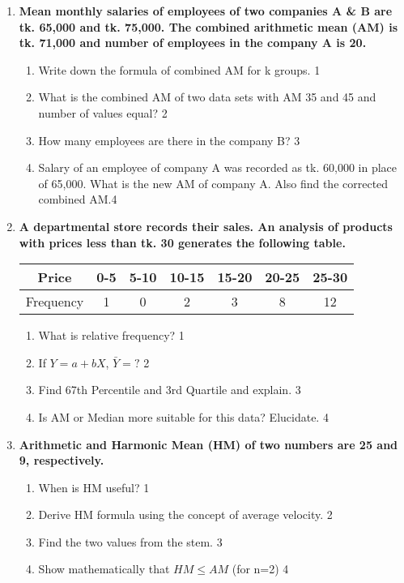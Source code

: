 \documentclass{article}
\begin{document}
\begin{enumerate}

   \item
	  \textbf{Mean monthly salaries of employees of two companies A \& B are tk. 65,000 and tk. 75,000. The combined arithmetic mean (AM) is tk. 71,000 and number of employees in the company A is 20.} 
	  
  \begin{enumerate}
    \item
	Write down the formula of combined AM for k groups. \hfill 1
    \item
	What is the combined AM of two data sets with AM 35 and 45 and number of values equal? \hfill 2
    \item  
	How many employees are there in the company B? \hfill 3
    \item
	Salary of an employee of company A was recorded as tk. 60,000 in place of 65,000. What is the new AM of company A. Also find the corrected combined AM.\hfill 4
  \end{enumerate}

     \item
	  \textbf{A departmental store records their sales. An analysis of products with prices less than tk. 30 generates the following table.} 
	  
\begin{table}[h]
\centering
\begin{tabular}{ccccccc}
Price     & 0-5 & 5-10 & 10-15 & 15-20 & 20-25 & 25-30 \\ \hline
Frequency & 1   & 0    & 2     & 3     & 8     & 12   
\end{tabular}
\end{table}
  
  \begin{enumerate}
    \item
	What is relative frequency? \hfill 1
    \item
	If $Y = a + bX$, $\bar Y = ?$ \hfill 2
    \item  
	Find 67th Percentile and 3rd Quartile and explain. \hfill 3
    \item
	Is AM or Median more suitable for this data? Elucidate. \hfill 4
  \end{enumerate}
  
   \item
	  \textbf{Arithmetic and Harmonic Mean (HM) of two numbers are 25 and 9, respectively.} 
    \begin{enumerate}
    \item
	When is HM useful? \hfill 1
    \item
	Derive HM formula using the concept of average velocity. \hfill 2
    \item  
	Find the two values from the stem. \hfill 3
    \item
	Show mathematically that $HM \le AM$ (for n=2) \hfill 4
  \end{enumerate}
  

\end{enumerate}
\end{document}
